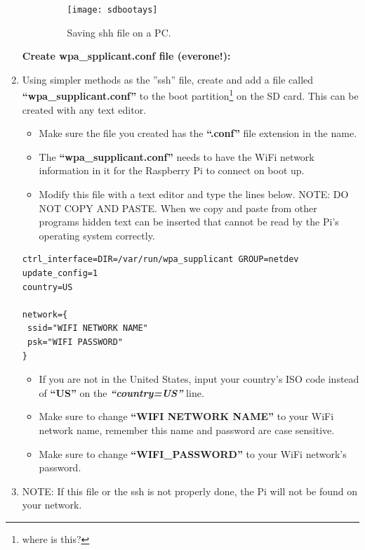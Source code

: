 \documentclass{article}
\begin{document}
\begin{enumerate}
\begin{itemize}
\begin{figure}
  \texttt{[image: sdbootays]}
  \caption{Saving shh file on a PC.}
  \label{fig:sdbootays}
\end{figure}
  \end{itemize}
  
\clearpage
  
\noindent \textbf{Create wpa\_spplicant.conf file (everone!):}

  \item Using simpler methods as the ''ssh'' file, create and add a file called \textbf{``wpa\_supplicant.conf''} to the boot partition\footnote{where is this?} on the SD card. This can be created with any text editor. %
  \begin{itemize}
  \item Make sure the file you created has the \textbf{``.conf''} file extension in the name.
  \item The \textbf{``wpa\_supplicant.conf''} needs to have the WiFi network information in it for the Raspberry Pi to connect on boot up.
  \item Modify this file with a text editor and type the lines below. NOTE: DO NOT COPY AND PASTE. When we copy and paste from other programs hidden text can be inserted that cannot be read by the Pi's operating system correctly.
  \end{itemize}

\begin{lstlisting}
ctrl_interface=DIR=/var/run/wpa_supplicant GROUP=netdev
update_config=1
country=US

network={
 ssid="WIFI NETWORK NAME"
 psk="WIFI PASSWORD"
}
\end{lstlisting}

  \begin{itemize}
  \item If you are not in the United States, input your country's ISO code instead of \textbf{``US''} on the \textbf{\textit{``country=US''}} line.
  \item Make sure to change \textbf{``WIFI NETWORK NAME''} to your WiFi network name, remember this name and password are case sensitive.
  \item Make sure to change \textbf{``WIFI\_PASSWORD''} to your WiFi network's password.
  \end{itemize}
  \item NOTE: If this file or the ssh is not properly done, the Pi will not be found on your network.
  
\end{enumerate}
\end{document}
